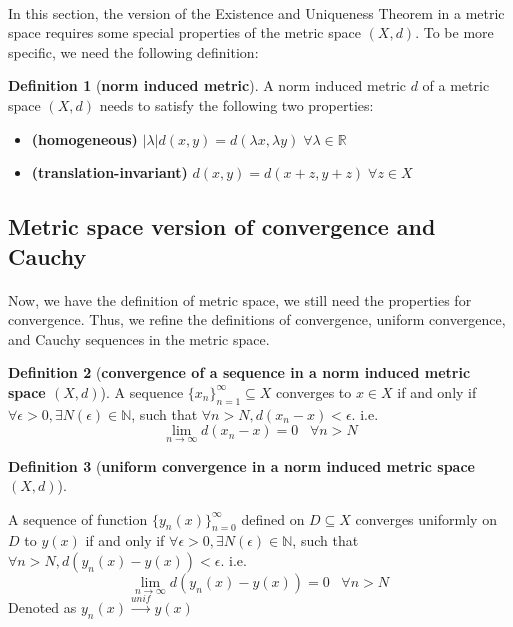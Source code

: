 \documentclass{article}
\theoremstyle{definition}
\newtheorem{definition}{Definition}[section]
\theoremstyle{remark}
\theoremstyle{example}
\begin{document}
\paragraph{  }

In this section, the version of the Existence and Uniqueness Theorem in a metric space requires some special properties of the metric space $(X,d)$. To be more specific, we need the following definition:

\begin{definition}[\textbf{norm induced metric}] \cite{rudin_functional_nodate}
    A norm induced metric $d$ of a metric space $(X,d)$ needs to satisfy the following two properties:
    \begin{itemize}
        \item \textbf{(homogeneous)} $\lvert \lambda \rvert d(x,y) = d(\lambda x, \lambda y) \;\forall \lambda \in \mathbb{R}$
        \item \textbf{(translation-invariant)} $d(x,y) = d(x+z,y+z) \;\forall z \in X$
    \end{itemize}
\end{definition}

\subsection{Metric space version of convergence and Cauchy}

\paragraph{  }

Now, we have the definition of metric space, we still need the properties for convergence. Thus, we refine the definitions of convergence, uniform convergence, and Cauchy sequences in the metric space.

\begin{definition}[\textbf{convergence of a sequence in a norm induced metric space $(X,d)$}]\label{def:ConvMetric}
    A sequence $\{x_n\}_{n=1}^{\infty} \subseteq X$ converges to $x \in X$ if and only if $\forall \epsilon > 0, \exists N(\epsilon) \in \mathbb{N}$, such that $\forall n > N, d(x_n - x) < \epsilon$. i.e. 
    \begin{equation}\label{eqn:ConvMetric}
        \lim_{n \to \infty}{d(x_n - x) = 0} \;\;\; \forall n > N
    \end{equation}
\end{definition}

\begin{definition}[\textbf{uniform convergence in a norm induced metric space $(X,d)$}]\label{def:uniConvMetric}

    A sequence of function $\{y_n(x)\}_{n = 0}^{\infty}$ defined on $D \subseteq X$ converges uniformly on $D$ to $y(x)$ if and only if $\forall \epsilon > 0, \exists N(\epsilon) \in \mathbb{N}$, such that $\forall n > N, d(y_n(x) - y(x)) < \epsilon$. i.e.
        \begin{equation}
            \lim_{n \to \infty}{d(y_n(x) - y(x))} = 0 \;\;\; \forall n > N
        \end{equation}
    Denoted as $y_n(x) \xrightarrow{unif} y(x)$
\end{definition}
\end{document}
